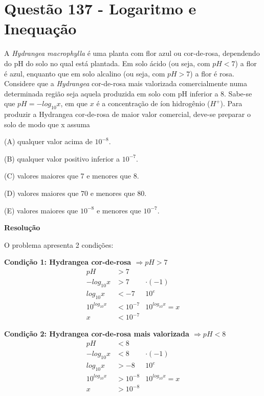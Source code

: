 \section{Questão 137 - Logaritmo e Inequação}

A \textit{Hydrangea macrophylla} é uma planta com flor azul ou cor-de-rosa, dependendo do pH do solo no qual está plantada. Em solo ácido (ou seja, com $ pH < 7 $) a flor é azul, enquanto que em solo alcalino (ou seja, com $ pH > 7 $) a flor é rosa. Considere que a \textit{Hydrangea} cor-de-rosa mais valorizada comercialmente numa determinada região seja aquela produzida em solo com pH inferior a 8. 
Sabe-se que $ pH = - log_{10} x $, em que $ x $ é a concentração de íon hidrogênio ($ H^+ $).
Para produzir a Hydrangea cor-de-rosa de maior valor comercial, deve-se preparar o solo de modo que x assuma

\noindent (A) qualquer valor acima de $ 10^{-8} $.

\noindent (B) qualquer valor positivo inferior a $ 10^{-7} $.

\noindent (C) valores maiores que 7 e menores que 8.

\noindent (D) valores maiores que 70 e menores que 80.

\noindent (E) valores maiores que $ 10^{-8} $ e menores que $ 10^{-7} $.


\textbf{Resolução}

O problema apresenta 2 condições:

\noindent \textbf{Condição 1: Hydrangea cor-de-rosa $ \Rightarrow pH > 7 $ }
\begin{align*}
            pH &> 7        &  \\
    -log_{10}x &> 7        & \cdot (-1) \\
     log_{10}x &< -7       & 10^e  \\
10^{log_{10}x} &< 10^{-7}  & 10^{log_{10}x} = x\\
            x  &< 10^{-7}  & 
\end{align*}


\noindent \textbf{Condição 2: Hydrangea cor-de-rosa mais valorizada $ \Rightarrow pH < 8 $ }
\begin{align*}
            pH &< 8        &  \\
    -log_{10}x &< 8        & \cdot (-1) \\
     log_{10}x &> -8       & 10^e  \\
10^{log_{10}x} &> 10^{-8}  & 10^{log_{10}x} = x\\
            x  &> 10^{-8}  & 
\end{align*}

